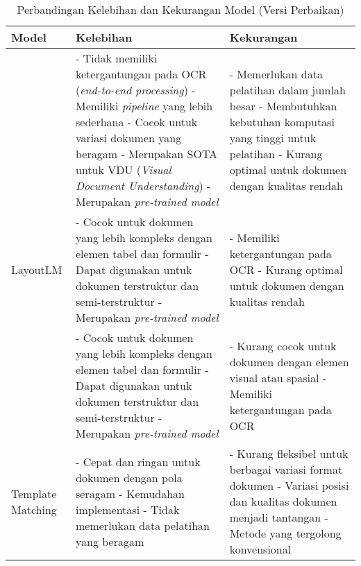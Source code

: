 \begin{table}[h!]
\caption{Perbandingan Kelebihan dan Kekurangan Model (Versi Perbaikan)}
\label{tab:model-comparison-fixed}
\begin{tabularx}{\textwidth}{| l | >{\RaggedRight}X | >{\RaggedRight}X |}
\hline
\textbf{Model} & \textbf{Kelebihan} & \textbf{Kekurangan} \\
\hline

\donut{} &
- Tidak memiliki ketergantungan pada OCR (\textit{end-to-end processing}) \newline
- Memiliki \textit{pipeline} yang lebih sederhana \newline
- Cocok untuk variasi dokumen yang beragam \newline
- Merupakan SOTA untuk VDU (\textit{Visual Document Understanding}) \newline
- Merupakan \textit{pre-trained model}
&
- Memerlukan data pelatihan dalam jumlah besar \newline
- Membutuhkan kebutuhan komputasi yang tinggi untuk pelatihan \newline
- Kurang optimal untuk dokumen dengan kualitas rendah
\\ \hline

LayoutLM &
- Cocok untuk dokumen yang lebih kompleks dengan elemen tabel dan formulir \newline
- Dapat digunakan untuk dokumen terstruktur dan semi-terstruktur \newline
- Merupakan \textit{pre-trained model}
&
- Memiliki ketergantungan pada OCR \newline
- Kurang optimal untuk dokumen dengan kualitas rendah
\\ \hline

\bert{} &
- Cocok untuk dokumen yang lebih kompleks dengan elemen tabel dan formulir \newline
- Dapat digunakan untuk dokumen terstruktur dan semi-terstruktur \newline
- Merupakan \textit{pre-trained model}
&
- Kurang cocok untuk dokumen dengan elemen visual atau spasial \newline
- Memiliki ketergantungan pada OCR
\\ \hline

Template Matching &
- Cepat dan ringan untuk dokumen dengan pola seragam \newline
- Kemudahan implementasi \newline
- Tidak memerlukan data pelatihan yang beragam
&
- Kurang fleksibel untuk berbagai variasi format dokumen \newline
- Variasi posisi dan kualitas dokumen menjadi tantangan \newline
- Metode yang tergolong konvensional
\\ \hline


\end{tabularx}
\end{table}
